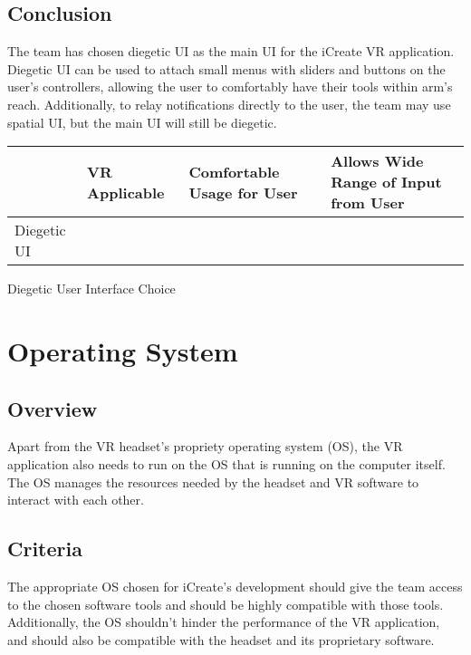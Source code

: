 \documentclass[letterpaper,10pt,onecolumn,compsoc]{IEEEtran}
\begin{document}
\newpage

\subsection{Conclusion}
The team has chosen diegetic UI as the main UI for the iCreate VR application. Diegetic UI can be used to attach small menus with sliders and buttons on the user’s controllers, allowing the user to comfortably have their tools within arm’s reach. Additionally, to relay notifications directly to the user, the team may use spatial UI, but the main UI will still be diegetic. 


\begin{center}
\begin{tabular}{ | P{2.5cm} | P{2.25cm} | P{4.5cm} | P{6cm} | } 
 	\hline
 	 & VR Applicable & Comfortable Usage for User & Allows Wide Range of Input from User \\ 
 	\hline 		
 	Diegetic UI & \checkmark & \checkmark & \checkmark \\ 
 	\hline
\end{tabular}
\end{center}

\begin{center}
Diegetic User Interface Choice
\end{center}

\newpage 

\section{Operating System}

\subsection{Overview}
Apart from the VR headset’s propriety operating system (OS), the VR application also needs to run on the OS that is running on the computer itself. The OS manages the resources needed by the headset and VR software to interact with each other. 

\subsection{Criteria}
The appropriate OS chosen for iCreate’s development should give the team access to the chosen software tools and should be highly compatible with those tools. Additionally, the OS shouldn’t hinder the performance of  the VR application, and should also be compatible with the headset and its proprietary software.
\end{document}

